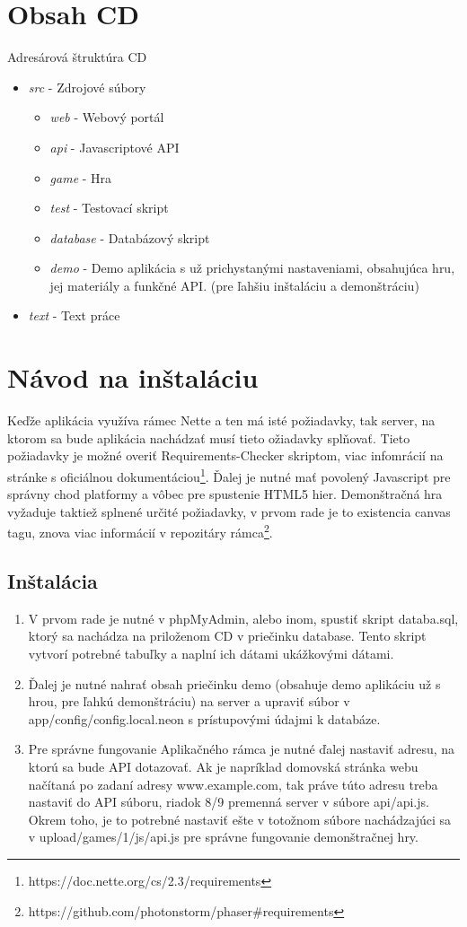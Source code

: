 \chapter{Obsah CD}
\label{pr:cd}
Adresárová štruktúra CD
\begin{itemize}
\item \textit{src} - Zdrojové súbory
    \begin{itemize}
    \item \textit{web} - Webový portál
    \item \textit{api} - Javascriptové API
    \item \textit{game} - Hra
    \item \textit{test} - Testovací skript
    \item \textit{database} - Databázový skript
    \item \textit{demo} - Demo aplikácia s už prichystanými nastaveniami, obsahujúca hru, jej materiály a funkčné API. (pre ľahšiu inštaláciu a demonštráciu)
    \end{itemize}
\item \textit{text} - Text práce
\end{itemize}

\chapter{Návod na inštaláciu}
\label{instalacia}
Keďže aplikácia využíva rámec Nette a ten má isté požiadavky, tak server, na ktorom sa bude aplikácia nachádzať musí tieto ožiadavky splňovať. Tieto požiadavky je možné overiť Requirements-Checker skriptom, viac infomrácií na stránke s oficiálnou dokumentáciou\footnote{https://doc.nette.org/cs/2.3/requirements}. Ďalej je nutné mať povolený Javascript pre správny chod platformy a vôbec pre spustenie HTML5 hier. Demonštračná hra vyžaduje taktiež splnené určité požiadavky, v prvom rade je to existencia canvas tagu, znova viac informácií v repozitáry rámca\footnote{https://github.com/photonstorm/phaser\#requirements}.
\section{Inštalácia}
\begin{enumerate}
\item V prvom rade je nutné v phpMyAdmin, alebo inom, spustiť skript databa.sql, ktorý sa nachádza na priloženom CD v priečinku database. Tento skript vytvorí potrebné tabuľky a naplní ich dátami ukážkovými dátami. 
\item Ďalej je nutné nahrať obsah priečinku demo (obsahuje demo aplikáciu už s hrou, pre ľahkú demonštráciu) na server a upraviť súbor v app/config/config.local.neon s prístupovými údajmi k databáze. 
\item Pre správne fungovanie Aplikačného rámca je nutné ďalej nastaviť adresu, na ktorú sa bude API dotazovať. Ak je napríklad domovská stránka webu načítaná po zadaní adresy www.example.com, tak práve túto adresu treba nastaviť do API súboru, riadok 8/9 premenná server v súbore api/api.js. Okrem toho, je to potrebné nastaviť ešte v totožnom súbore nachádzajúci sa v upload/games/1/js/api.js pre správne fungovanie demonštračnej hry.
\end{enumerate}

